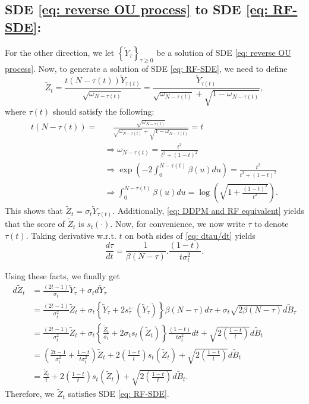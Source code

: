 \documentclass{article}
\theoremstyle{plain}
\theoremstyle{definition}
\theoremstyle{remark}
\newcommand{\bc}[1]{\left\{{#1}\right\}}
\newcommand{\br}[1]{\left({#1}\right)}
\begin{document}
\subsection*{SDE \eqref{eq: reverse OU process} to SDE \eqref{eq: RF-SDE}:}
For the other direction, we let $\bc{\overleftarrow Y_\tau}_{\tau\ge 0}$ be a solution of SDE \eqref{eq: reverse OU process}. Now, to generate a solution of SDE \eqref{eq: RF-SDE}, we need to define 
\[
\tilde Z_t = \frac{t(N - \tau(t)) \overleftarrow Y_{\tau(t)}}{\sqrt{\omega_{N - \tau(t)}}} = \frac{\overleftarrow Y_{\tau(t)}}{\sqrt{\omega_{N - \tau(t)}} + \sqrt{1 - \omega_{N - \tau(t)}}},
\]
where $\tau(t)$ should satisfy the following: 
\begin{equation}
\label{eq: dtau/dt}
\begin{aligned}
  t(N - \tau(t)) =  & \quad \frac{\sqrt{\omega_{N - \tau(t)}}}{\sqrt{\omega_{N - \tau(t)}} + \sqrt{1  - \omega_{N - \tau(t)}}} = t\\
    & \Rightarrow \omega_{N - \tau(t)} = \frac{t^2}{t^2 + (1-t)^2}\\
    & \Rightarrow \exp \br{- 2 \int_0^{N - \tau(t)} \beta(u) du} = \frac{t^2}{t^2 + (1-t)^2}\\
    & \Rightarrow \int_{0}^{N - \tau(t)} \beta(u) du = \log \br{\sqrt{1 + \frac{(1-t)^2}{t^2}}}.
\end{aligned}
\end{equation}
This shows that $\tilde Z_t = \sigma_{t} \overleftarrow Y_{\tau(t)}$. Additionally, \eqref{eq: DDPM and RF equivalent} yields that the score of $\tilde Z_t$ is $s_t(\cdot)$.
Now, for convenience, we now write $\tau$ to denote $\tau(t)$.
Taking derivative w.r.t. $t$ on both sides of \eqref{eq: dtau/dt} yields
\[
\frac{d \tau}{dt } =  \frac{1}{\beta(N - \tau)}. \frac{(1-t)}{t \sigma_t^2}.
\]

Using these facts, we finally get 
\begin{equation*}
    \begin{aligned}
        d \tilde Z_t & = \frac{(2t - 1)}{\sigma_t} \overleftarrow Y_\tau + \sigma_t d\overleftarrow Y_{\tau} \\
        & = \frac{(2t -1)}{\sigma_t^2} \tilde Z_t + \sigma_t \bc{\overleftarrow Y_\tau + 2 s_\tau^\leftarrow (\overleftarrow Y_\tau)} \beta(N - \tau) d\tau + \sigma_t \sqrt{2 \beta(N - \tau)} d \overleftarrow B_\tau\\
        & = \frac{(2t -1)}{\sigma^2_t} \tilde Z_t + \sigma_t \bc{\frac{\tilde Z_t}{\sigma_t} + 2 \sigma_t s_t(\tilde Z_t)} \frac{(1-t)}{t \sigma_t^2} dt + \sqrt{2 \br{\frac{1-t}{t}}} d \tilde B_t\\
        & = \br{ \frac{2t - 1}{\sigma_t^2} + \frac{1-t}{t \sigma_t^2}} \tilde Z_t + 2 \br{\frac{1-t}{t}} s_t(\tilde Z_t)+ \sqrt{2 \br{\frac{1-t}{t}}} d \tilde B_t\\
        & = \frac{\tilde Z_t}{t}+  2 \br{\frac{1-t}{t}} s_t(\tilde Z_t)+ \sqrt{2 \br{\frac{1-t}{t}}} d \tilde B_t.
    \end{aligned}
\end{equation*}
Therefore, we $\tilde Z_t$ satisfies SDE \eqref{eq: RF-SDE}.
\end{document}
